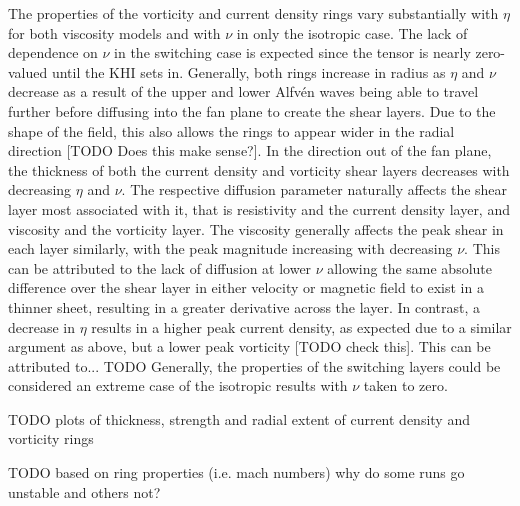 The properties of the vorticity and current density rings vary substantially with $\eta$ for both viscosity models and with $\nu$ in only the isotropic case. The lack of dependence on $\nu$ in the switching case is expected since the tensor is nearly zero-valued until the KHI sets in. Generally, both rings increase in radius as $\eta$ and $\nu$ decrease as a result of the upper and lower Alfv\'en waves being able to travel further before diffusing into the fan plane to create the shear layers. Due to the shape of the field, this also allows the rings to appear wider in the radial direction [TODO Does this make sense?]. In the direction out of the fan plane, the thickness of both the current density and vorticity shear layers decreases with decreasing $\eta$ and $\nu$. The respective diffusion parameter naturally affects the shear layer most associated with it, that is resistivity and the current density layer, and viscosity and the vorticity layer. The viscosity generally affects the peak shear in each layer similarly, with the peak magnitude increasing with decreasing $\nu$. This can be attributed to the lack of diffusion at lower $\nu$ allowing the same absolute difference over the shear layer in either velocity or magnetic field to exist in a thinner sheet, resulting in a greater derivative across the layer. In contrast, a decrease in $\eta$ results in a higher peak current density, as expected due to a similar argument as above, but a lower peak vorticity [TODO check this]. This can be attributed to... TODO Generally, the properties of the switching layers could be considered an extreme case of the isotropic results with $\nu$ taken to zero.

TODO plots of thickness, strength and radial extent of current density and vorticity rings

TODO based on ring properties (i.e. mach numbers) why do some runs go unstable and others not?

